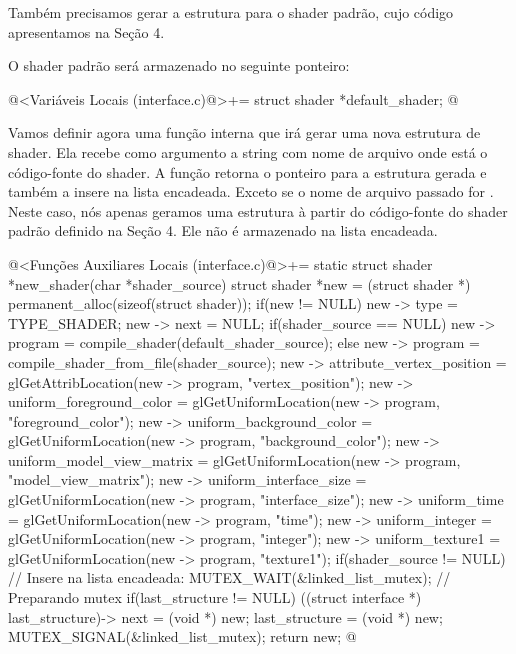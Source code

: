 Também precisamos gerar a estrutura para o shader padrão, cujo código
apresentamos na Seção 4.

O shader padrão será armazenado no seguinte ponteiro:

\iniciocodigo
@<Variáveis Locais (interface.c)@>+=
struct shader *default_shader;
@
\fimcodigo

Vamos definir agora uma função interna que irá gerar uma nova
estrutura de shader. Ela recebe como argumento a string com nome de
arquivo onde está o código-fonte do shader. A função retorna o
ponteiro para a estrutura gerada e também a insere na lista
encadeada. Exceto se o nome de arquivo passado
for . Neste caso, nós apenas geramos uma estrutura à
partir do código-fonte do shader padrão definido na Seção 4. Ele não é
armazenado na lista encadeada.

\iniciocodigo
@<Funções Auxiliares Locais (interface.c)@>+=
static struct shader *new_shader(char *shader_source){
  struct shader *new = (struct shader *) permanent_alloc(sizeof(struct shader));
  if(new != NULL){
    new -> type = TYPE_SHADER;
    new -> next = NULL;
    if(shader_source == NULL)
      new -> program = compile_shader(default_shader_source);
    else
      new -> program = compile_shader_from_file(shader_source);
    new -> attribute_vertex_position = glGetAttribLocation(new -> program,
                                                           "vertex_position");
    new -> uniform_foreground_color =  glGetUniformLocation(new -> program,
                                                            "foreground_color");
    new -> uniform_background_color =  glGetUniformLocation(new -> program,
                                                            "background_color");
    new -> uniform_model_view_matrix = glGetUniformLocation(new -> program,
                                                            "model_view_matrix");
    new -> uniform_interface_size = glGetUniformLocation(new -> program,
                                                         "interface_size");
    new -> uniform_time = glGetUniformLocation(new -> program, "time");
    new -> uniform_integer = glGetUniformLocation(new -> program, "integer");
    new -> uniform_texture1 = glGetUniformLocation(new -> program, "texture1");
    if(shader_source != NULL){ // Insere na lista encadeada:
      MUTEX_WAIT(&linked_list_mutex); // Preparando mutex
      if(last_structure != NULL)
        ((struct interface *) last_structure)-> next = (void *) new;
      last_structure = (void *) new;
      MUTEX_SIGNAL(&linked_list_mutex);
    }
  }
  return new;
}
@
\fimcodigo

